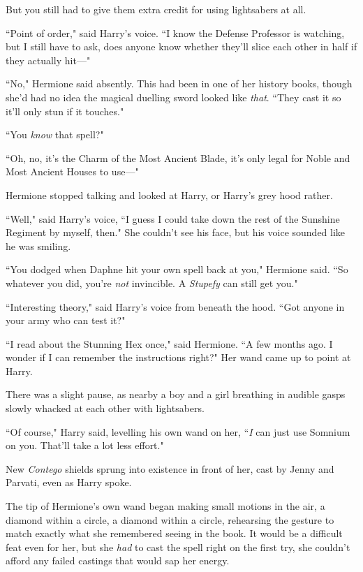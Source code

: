 But you still had to give them extra credit for using lightsabers at all.

``Point of order," said Harry's voice. ``I know the Defense Professor is watching, but I still have to ask, does anyone know whether they'll slice each other in half if they actually hit—"

``No," Hermione said absently. This had been in one of her history books, though she'd had no idea the magical duelling sword looked like \emph{that}. ``They cast it so it'll only stun if it touches."

``You \emph{know} that spell?"

``Oh, no, it's the Charm of the Most Ancient Blade, it's only legal for Noble and Most Ancient Houses to use—"

Hermione stopped talking and looked at Harry, or Harry's grey hood rather.

``Well," said Harry's voice, ``I guess I could take down the rest of the Sunshine Regiment by myself, then." She couldn't see his face, but his voice sounded like he was smiling.

``You dodged when Daphne hit your own spell back at you," Hermione said. ``So whatever you did, you're \emph{not} invincible. A \emph{Stupefy} can still get you."

``Interesting theory," said Harry's voice from beneath the hood. ``Got anyone in your army who can test it?"

``I read about the Stunning Hex once," said Hermione. ``A few months ago. I wonder if I can remember the instructions right?" Her wand came up to point at Harry.

There was a slight pause, as nearby a boy and a girl breathing in audible gasps slowly whacked at each other with lightsabers.

``Of course," Harry said, levelling his own wand on her, ``\emph{I} can just use Somnium on you. That'll take a lot less effort."

New \emph{Contego} shields sprung into existence in front of her, cast by Jenny and Parvati, even as Harry spoke.

The tip of Hermione's own wand began making small motions in the air, a diamond within a circle, a diamond within a circle, rehearsing the gesture to match exactly what she remembered seeing in the book. It would be a difficult feat even for her, but she \emph{had} to cast the spell right on the first try, she couldn't afford any failed castings that would sap her energy.

